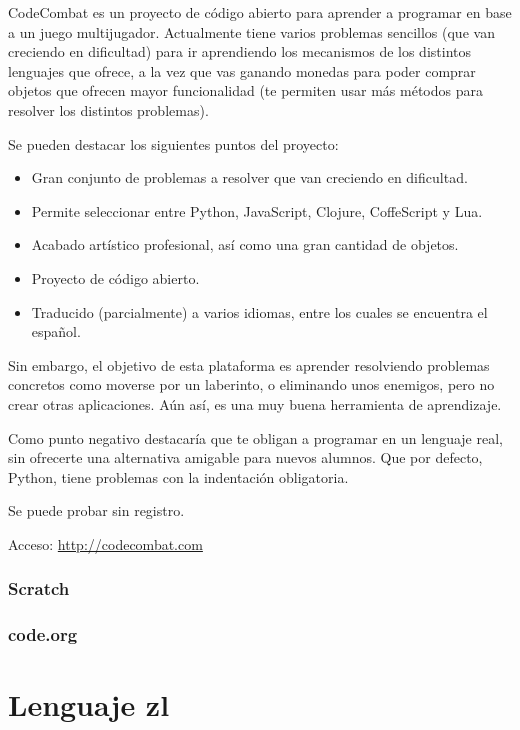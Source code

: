 \documentclass{report}
\begin{document}
CodeCombat es un proyecto de código abierto para aprender a programar en base a un juego multijugador. Actualmente tiene varios problemas sencillos (que van creciendo en dificultad) para ir aprendiendo los mecanismos de los distintos lenguajes que ofrece, a la vez que vas ganando monedas para poder comprar objetos que ofrecen mayor funcionalidad (te permiten usar más métodos para resolver los distintos problemas).


Se pueden destacar los siguientes puntos del proyecto:

\begin{itemize}
	\item Gran conjunto de problemas a resolver que van creciendo en dificultad.
	\item Permite seleccionar entre Python, JavaScript, Clojure, CoffeScript y Lua.
	\item Acabado artístico profesional, así como una gran cantidad de objetos.
	\item Proyecto de código abierto.
	\item Traducido (parcialmente) a varios idiomas, entre los cuales se encuentra el español.
\end{itemize}

Sin embargo, el objetivo de esta plataforma es aprender resolviendo problemas concretos como moverse por un laberinto, o eliminando unos enemigos, pero no crear otras aplicaciones. Aún así, es una muy buena herramienta de aprendizaje.

Como punto negativo destacaría que te obligan a programar en un lenguaje real, sin ofrecerte una alternativa amigable para nuevos alumnos. Que por defecto, Python, tiene problemas con la indentación obligatoria.

Se puede probar sin registro. 

Acceso: \url{http://codecombat.com}

\subsection{Scratch}

\subsection{code.org}

\chapter{Lenguaje zl}
\end{document}
